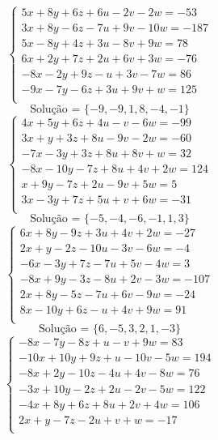 \documentclass[12pt,oneside,a4paper]{article}
\begin{document}
\vspace{\baselineskip}
\begin{equation*}
\begin{cases}
5x+8y+6z+6u-2v-2w=-53 \\
3x+8y-6z-7u+9v-10w=-187 \\
5x-8y+4z+3u-8v+9w=78 \\
6x+2y+7z+2u+6v+3w=-76 \\
-8x-2y+9z-u+3v-7w=86 \\
-9x-7y-6z+3u+9v+w=125 \\
\end{cases}
\end{equation*}
\begin{equation*}
\text{Solução = }\{-9,-9,1,8,-4,-1\}
\end{equation*}
\vspace{\baselineskip}
\begin{equation*}
\begin{cases}
4x+5y+6z+4u-v-6w=-99 \\
3x+y+3z+8u-9v-2w=-60 \\
-7x-3y+3z+8u+8v+w=32 \\
-8x-10y-7z+8u+4v+2w=124 \\
x+9y-7z+2u-9v+5w=5 \\
3x-3y+7z+5u+v+6w=-31 \\
\end{cases}
\end{equation*}
\begin{equation*}
\text{Solução = }\{-5,-4,-6,-1,1,3\}
\end{equation*}
\vspace{\baselineskip}
\begin{equation*}
\begin{cases}
6x+8y-9z+3u+4v+2w=-27 \\
2x+y-2z-10u-3v-6w=-4 \\
-6x-3y+7z-7u+5v-4w=3 \\
-8x+9y-3z-8u+2v-3w=-107 \\
2x+8y-5z-7u+6v-9w=-24 \\
8x-10y+6z-u+4v+9w=91 \\
\end{cases}
\end{equation*}
\begin{equation*}
\text{Solução = }\{6,-5,3,2,1,-3\}
\end{equation*}
\vspace{\baselineskip}
\begin{equation*}
\begin{cases}
-8x-7y-8z+u-v+9w=83 \\
-10x+10y+9z+u-10v-5w=194 \\
-8x+2y-10z-4u+4v-8w=76 \\
-3x+10y-2z+2u-2v-5w=122 \\
-4x+8y+6z+8u+2v+4w=106 \\
2x+y-7z-2u+v+w=-17 \\
\end{cases}
\end{equation*}
\end{document}
